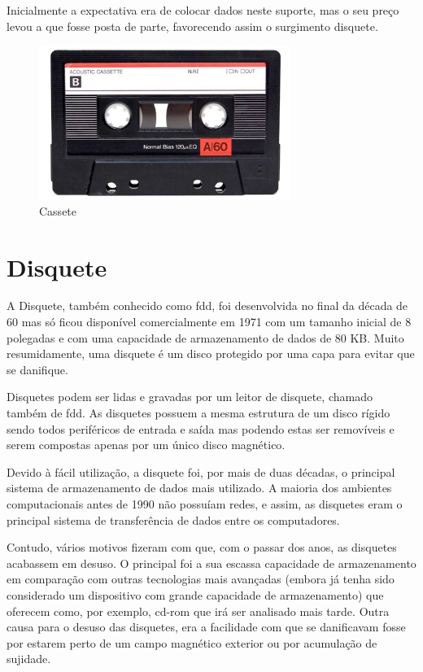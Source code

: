 \documentclass{report}
\begin{document}
	Inicialmente a expectativa era de colocar dados neste suporte, mas o seu preço levou a que fosse posta de parte, favorecendo assim o surgimento disquete.
	
	\begin{figure} [h]
		\centering
		\includegraphics[width=8.19cm, height=5cm]{cassete.jpg}
		\caption{Cassete}
	\end{figure}		
		
\newpage

		\section{Disquete}
		A Disquete, também conhecido como \ac{fdd}, foi desenvolvida no final da década de 60 mas só ficou disponível comercialmente em 1971 com um tamanho inicial de 8 polegadas e com uma capacidade de armazenamento de dados de 80 KB. Muito resumidamente, uma disquete é um disco protegido por uma capa para evitar que se danifique. 
\vspace{1mm}

		Disquetes podem ser lidas e gravadas por um leitor de disquete, chamado também de \ac{fdd}. As disquetes possuem a mesma estrutura de um disco rígido sendo todos periféricos de entrada e saída mas podendo estas ser removíveis e serem compostas apenas por um único disco magnético.
\vspace{1mm}
		
		 Devido à fácil utilização, a disquete foi, por mais de duas décadas, o principal sistema de armazenamento de dados mais utilizado. A maioria dos ambientes computacionais antes de 1990 não possuíam redes, e assim, as disquetes eram o principal sistema de transferência de dados entre os computadores.
\vspace{1mm}
		
		Contudo, vários motivos fizeram com que, com o passar dos anos, as disquetes acabassem em desuso. O principal foi a sua escassa capacidade de armazenamento em comparação com outras tecnologias mais avançadas (embora já tenha sido considerado um dispositivo com grande capacidade de armazenamento) que oferecem como, por exemplo, \ac{cd-rom} que irá ser analisado mais tarde. Outra causa para o desuso das disquetes, era a facilidade com que se danificavam fosse por estarem perto de um campo magnético exterior ou por acumulação de sujidade.
\vspace{1mm}
	
\end{document}
